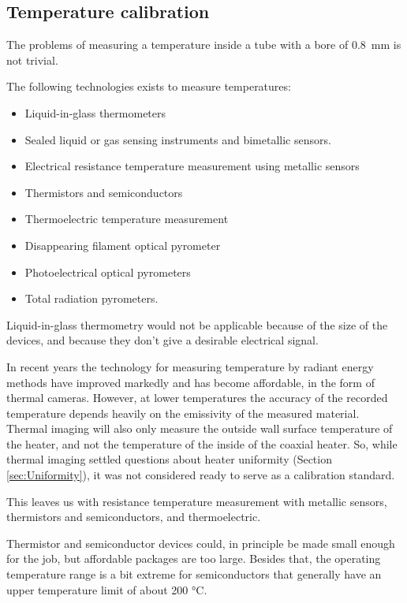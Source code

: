 \subsection{Temperature calibration}

The problems of measuring a temperature inside a tube with a bore of \SI{0.8}{\milli\metre} is not trivial.

The following technologies exists to measure temperatures:
\begin{itemize}
	\item Liquid-in-glass thermometers
	\item Sealed liquid or gas sensing instruments and bimetallic sensors.
	\item Electrical resistance temperature measurement using metallic sensors
	\item Thermistors and semiconductors
	\item Thermoelectric temperature measurement
	\item Disappearing filament optical pyrometer
	\item Photoelectrical optical pyrometers
	\item Total radiation pyrometers.
\end{itemize}

Liquid-in-glass thermometry would not be applicable because of the size of the
devices, and because they don't give a desirable electrical signal. 

In recent years the technology for measuring temperature by radiant energy
methods have improved markedly and has become affordable, in the form of thermal
cameras. However, at lower temperatures the accuracy of the recorded temperature
depends heavily on the emissivity of the measured material. Thermal imaging will
also only measure the outside wall surface temperature of the heater, and not
the temperature of the inside of the coaxial heater. So, while thermal imaging
settled questions about heater uniformity (Section \ref{sec:Uniformity}), it was
not considered ready to serve as a calibration standard. 

This leaves us with resistance temperature measurement with metallic
sensors, thermistors and semiconductors, and thermoelectric.

Thermistor and semiconductor devices could, in principle be made small enough
for the job, but affordable packages are too large. Besides that, the operating
temperature range is a bit extreme for semiconductors that generally have an
upper temperature limit of about 200  \si{\celsius}. 

